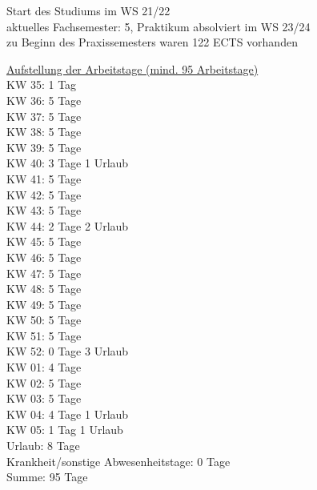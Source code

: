 
  Start des Studiums im WS 21/22 \\ 
	aktuelles Fachsemester: 5, Praktikum absolviert im WS 23/24 \\
	zu Beginn des Praxissemesters waren 122 ECTS vorhanden

	\underline{Aufstellung der Arbeitstage (mind. 95 Arbeitstage)} \\
	KW 35: 1 Tag \\
	KW 36: 5 Tage \\
	KW 37: 5 Tage \\
	KW 38: 5 Tage \\
	KW 39: 5 Tage \\
	KW 40: 3 Tage 1 Urlaub \\
	KW 41: 5 Tage \\
	KW 42: 5 Tage \\
	KW 43: 5 Tage \\
	KW 44: 2 Tage 2 Urlaub \\
	KW 45: 5 Tage \\
	KW 46: 5 Tage \\
	KW 47: 5 Tage \\
	KW 48: 5 Tage \\
	KW 49: 5 Tage \\
	KW 50: 5 Tage \\
	KW 51: 5 Tage \\
	KW 52: 0 Tage 3 Urlaub \\
	KW 01: 4 Tage \\
	KW 02: 5 Tage \\
	KW 03: 5 Tage \\
	KW 04: 4 Tage 1 Urlaub \\
	KW 05: 1 Tag 1 Urlaub \\
	Urlaub: 8 Tage \\
	Krankheit/sonstige Abwesenheitstage: 0 Tage \\
	Summe: 95 Tage \\
